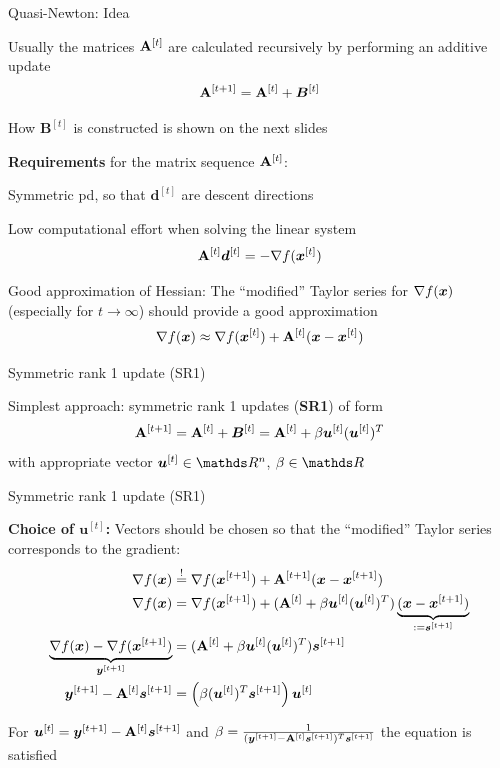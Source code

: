 \documentclass[11pt,compress,t,notes=noshow, xcolor=table]{beamer}
\begin{document}
\begin{framei}{Quasi-Newton: Idea}
\item Usually the matrices $\mathbf{A}^{[t]}$ are calculated recursively by performing an additive update
$$
\mathbf{A}^{[t+1]} = \mathbf{A}^{[t]} + \bm{B}^{[t]}
$$
\item How $\bm{B}^{[t]}$ is constructed is shown on the next slides
\vfill
\item \textbf{Requirements} for the matrix sequence $\mathbf{A}^{[t]}$:
\begin{itemizeS}
\item Symmetric pd, so that $\bm{d}^{[t]}$ are descent directions
\item Low computational effort when solving the linear system
$$
\mathbf{A}^{[t]} \bm{d}^{[t]} = - \nabla f(\bm{x}^{[t]})
$$
\item Good approximation of Hessian: The ``modified'' Taylor series for $\nabla f(\bm{x})$ (especially for $t \to \infty$) should provide a good approximation
$$
\nabla f(\bm{x}) \approx \nabla f(\bm{x}^{[t]}) + \mathbf{A}^{[t]}(\bm{x} - \bm{x}^{[t]})
$$
\end{itemizeS}
\end{framei}


\begin{framei}{Symmetric rank 1 update (SR1)}
\item Simplest approach: symmetric rank 1 updates (\textbf{SR1}) of form
$$
\mathbf{A}^{[t+1]} = \mathbf{A}^{[t]} + \bm{B}^{[t]} = \mathbf{A}^{[t]} + \beta \bm{u}^{[t]}(\bm{u}^{[t]})^T
$$
with appropriate vector $\bm{u}^{[t]} \in \R^n$, $\beta \in \R$
\end{framei}


\begin{framei}[fs=small]{Symmetric rank 1 update (SR1)}
\item \textbf{Choice of $\bm{u}^{[t]}$:} Vectors should be chosen so that the ``modified'' Taylor series corresponds to the gradient:
$$
\begin{aligned}
\nabla f(\bm{x}) &\overset{!}{=} \nabla f(\bm{x}^{[t+1]}) + \mathbf{A}^{[t+1]}(\bm{x} - \bm{x}^{[t+1]}) \\
\nabla f(\bm{x}) &= \nabla f(\bm{x}^{[t+1]}) +  (\mathbf{A}^{[t]} + \beta \bm{u}^{[t]}(\bm{u}^{[t]})^T)\underbrace{(\bm{x} - \bm{x}^{[t+1]})}_{:= \bm{s}^{[t+1]}} \\
\underbrace{\nabla f(\bm{x}) - \nabla f(\bm{x}^{[t+1]})}_{\bm{y}^{[t+1]}} &= (\mathbf{A}^{[t]} + \beta \bm{u}^{[t]} (\bm{u}^{[t]})^T) \bm{s}^{[t+1]} \\
\bm{y}^{[t+1]} - \mathbf{A}^{[t]} \bm{s}^{[t+1]} &= \left(\beta (\bm{u}^{[t]})^T \bm{s}^{[t+1]}\right) \bm{u}^{[t]}
\end{aligned}
$$
\item For $\bm{u}^{[t]} = \bm{y}^{[t+1]} - \mathbf{A}^{[t]} \bm{s}^{[t+1]}$ and $\beta = \frac{1}{(\bm{y}^{[t+1]} - \mathbf{A}^{[t]}\bm{s}^{[t+1]})^T\bm{s}^{[t+1]}}$ the equation is satisfied
\end{framei}
\end{document}

